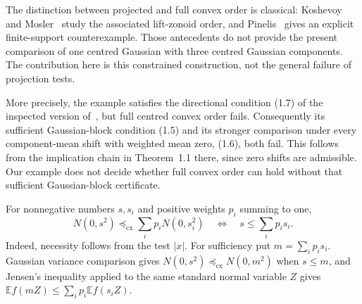 \documentclass[11pt]{article}
\newcommand{\E}{\mathbb E}
\newcommand{\cx}{\preceq_{\mathrm{cx}}}
\begin{document}
The distinction between projected and full convex order is classical: Koshevoy and Mosler~\cite{KM} study the associated lift-zonoid order, and Pinelis~\cite{P} gives an explicit finite-support counterexample. Those antecedents do not provide the present comparison of one centred Gaussian with three centred Gaussian components. The contribution here is this constrained construction, not the general failure of projection tests.

More precisely, the example satisfies the directional condition (1.7) of the inspected version of~\cite{JP}, but full centred convex order fails. Consequently its sufficient Gaussian-block condition (1.5) and its stronger comparison under every component-mean shift with weighted mean zero, (1.6), both fail. This follows from the implication chain in Theorem~1.1 there, since zero shifts are admissible. Our example does not decide whether full convex order can hold without that sufficient Gaussian-block certificate.

For nonnegative numbers $s,s_i$ and positive weights $p_i$ summing to one,
\begin{equation}\label{scalar}
 N(0,s^2)\cx\sum_i p_iN(0,s_i^2)
 \quad\Longleftrightarrow\quad s\le\sum_i p_i s_i.
\end{equation}
Indeed, necessity follows from the test $|x|$. For sufficiency put $m=\sum_i p_i s_i$. Gaussian variance comparison gives $N(0,s^2)\cx N(0,m^2)$ when $s\le m$, and Jensen's inequality applied to the same standard normal variable $Z$ gives $\E f(mZ)\le\sum_i p_i\E f(s_i Z)$.
\end{document}
